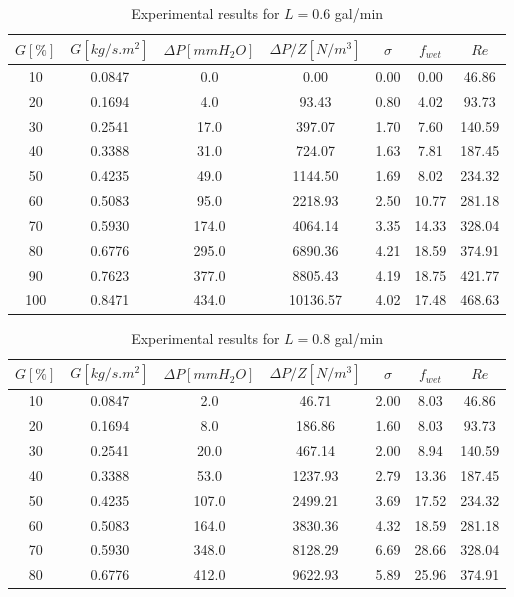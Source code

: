 \begin{table}[H]
    \centering
    \caption{Experimental results for $L=0.6$ gal/min}
    \begin{tabular}{ccccccc}
        \hline
        $G [\%]$ & $G [kg/s.m^2]$ & $\Delta P [mmH_2O]$ & $\Delta P/Z [N/m^3]$ & $\sigma$ & $f_{wet}$ & $Re$ \\
        \hline
        10 & 0.0847 & 0.0 & 0.00 & 0.00 & 0.00 & 46.86 \\
        20 & 0.1694 & 4.0 & 93.43 & 0.80 & 4.02 & 93.73 \\
        30 & 0.2541 & 17.0 & 397.07 & 1.70 & 7.60 & 140.59 \\
        40 & 0.3388 & 31.0 & 724.07 & 1.63 & 7.81 & 187.45 \\
        50 & 0.4235 & 49.0 & 1144.50 & 1.69 & 8.02 & 234.32 \\
        60 & 0.5083 & 95.0 & 2218.93 & 2.50 & 10.77 & 281.18 \\
        70 & 0.5930 & 174.0 & 4064.14 & 3.35 & 14.33 & 328.04 \\
        80 & 0.6776 & 295.0 & 6890.36 & 4.21 & 18.59 & 374.91 \\
        90 & 0.7623 & 377.0 & 8805.43 & 4.19 & 18.75 & 421.77 \\
        100 & 0.8471 & 434.0 & 10136.57 & 4.02 & 17.48 & 468.63 \\
        \hline
    \end{tabular}
\end{table}

\begin{table}[H]
    \centering
    \caption{Experimental results for $L=0.8$ gal/min}
    \begin{tabular}{ccccccc}
        \hline
        $G [\%]$ & $G [kg/s.m^2]$ & $\Delta P [mmH_2O]$ & $\Delta P/Z [N/m^3]$ & $\sigma$ & $f_{wet}$ & $Re$ \\
        \hline
        10 & 0.0847 & 2.0 & 46.71 & 2.00 & 8.03 & 46.86 \\
        20 & 0.1694 & 8.0 & 186.86 & 1.60 & 8.03 & 93.73 \\
        30 & 0.2541 & 20.0 & 467.14 & 2.00 & 8.94 & 140.59 \\
        40 & 0.3388 & 53.0 & 1237.93 & 2.79 & 13.36 & 187.45 \\
        50 & 0.4235 & 107.0 & 2499.21 & 3.69 & 17.52 & 234.32 \\
        60 & 0.5083 & 164.0 & 3830.36 & 4.32 & 18.59 & 281.18 \\
        70 & 0.5930 & 348.0 & 8128.29 & 6.69 & 28.66 & 328.04 \\
        80 & 0.6776 & 412.0 & 9622.93 & 5.89 & 25.96 & 374.91 \\
        \hline
    \end{tabular}
\end{table}

